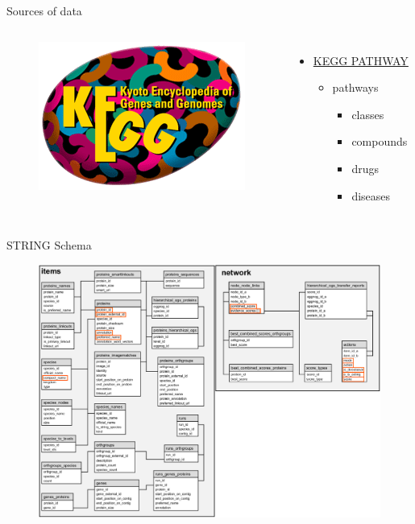 \documentclass{beamer}
\begin{document}
\begin{frame}{Sources of data}
\begin{columns}[c]
\begin{figure}
    \centering
    \includegraphics[width=0.9\linewidth]{kegg_logo.png}
\end{figure}
\begin{itemize}
    \item \href{https://www.genome.jp/kegg/pathway.html}{KEGG PATHWAY}
    \begin{itemize}
        \item pathways
        \begin{itemize}
            \item classes
            \item compounds
            \item drugs
            \item diseases
        \end{itemize}
    \end{itemize}
\end{itemize}

\end{columns}
\end{frame}

\begin{frame}{STRING Schema}
\begin{figure}
    \centering
    \includegraphics[width=\linewidth]{string-tables.png}
\end{figure}
\end{frame}
\end{document}
